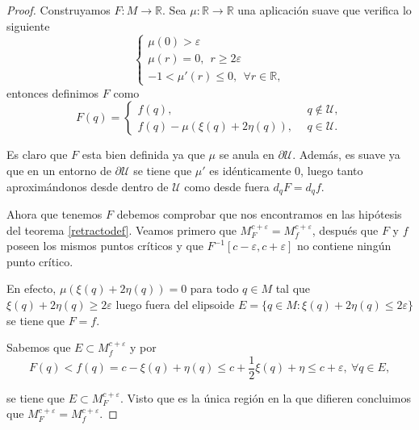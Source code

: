 \begin{proof}
    Construyamos $F:M\to \mathbb{R}$. Sea $\mu:\mathbb{R}\to\mathbb{R}$ una aplicación suave que verifica lo siguiente
    \begin{equation*}
        \begin{cases}
        \mu(0)>\varepsilon\\[3pt]
        \mu(r)=0, ~~r\ge 2\varepsilon\\[3pt]
        -1<\mu'(r)\le 0, ~~\forall r\in \mathbb{R},
        \end{cases}
    \end{equation*}
    entonces definimos $F$ como
    \vspace{1em}
    \begin{equation*}
        F(q)=
        \begin{cases}
        f(q),&~~q\notin \mathcal{U},\\
        f(q)- \mu(\xi(q)+2\eta(q)),&~~q\in \mathcal{U}.
        \end{cases}
    \end{equation*}

    Es claro que $F$ esta bien definida ya que $\mu$ se anula en $\partial\mathcal{U}$. Además, es suave ya que en un entorno de $\partial\mathcal{U}$ se tiene que $\mu'$ es idénticamente $0$, luego tanto aproximándonos desde dentro de $\mathcal{U}$ como desde fuera $d_qF=d_qf$.

    \bigskip
    

    Ahora que tenemos $F$ debemos comprobar que nos encontramos en las hipótesis del teorema \ref{retractodef}. Veamos primero que $M_F^{c+\varepsilon}=M_f^{c+\varepsilon}$, después que $F$ y $f$ poseen los mismos puntos críticos y que $F^{-1}[c-\varepsilon,c+\varepsilon]$ no contiene ningún punto crítico.

    En efecto, $\mu(\xi(q)+2\eta(q))=0$ para todo $q\in M$ tal que $\xi(q)+2\eta(q)\ge 2\varepsilon$ luego fuera del elipsoide $E=\{q\in M:\xi(q)+2\eta(q)\le 2\varepsilon\}$ se tiene que $F=f$.

    \medskip
    
    Sabemos que $E\subset M_f^{c+\varepsilon}$ y por
    \begin{equation*}
        F(q)<f(q)=c-\xi(q)+\eta(q)\le c+\frac{1}{2}\xi(q)+\eta\le c + \varepsilon, ~\forall q\in E,
    \end{equation*}

    se tiene que $E\subset M_F^{c+\varepsilon}$. Visto que es la única región en la que difieren concluimos que $M_F^{c+\varepsilon}=M_f^{c+\varepsilon}$.


\end{proof}
